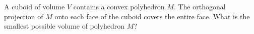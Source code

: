 A cuboid of volume $V$ contains a convex polyhedron $M$. The orthogonal projection of $M$ onto each face of the cuboid covers the entire face. What is the smallest possible volume of polyhedron $M$?